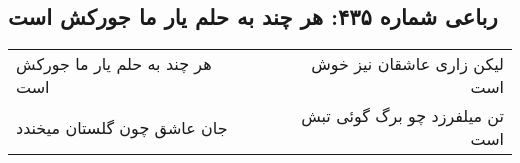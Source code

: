 \begin{center}
\section*{رباعی شماره ۴۳۵: هر چند به حلم یار ما جورکش است}
\label{sec:0435}
\begin{longtable}{l p{0.5cm} r}
هر چند به حلم یار ما جورکش است
&&
لیکن زاری عاشقان نیز خوش است
\\
جان عاشق چون گلستان میخندد
&&
تن میلفرزد چو برگ گوئی تبش است
\\
\end{longtable}
\end{center}
